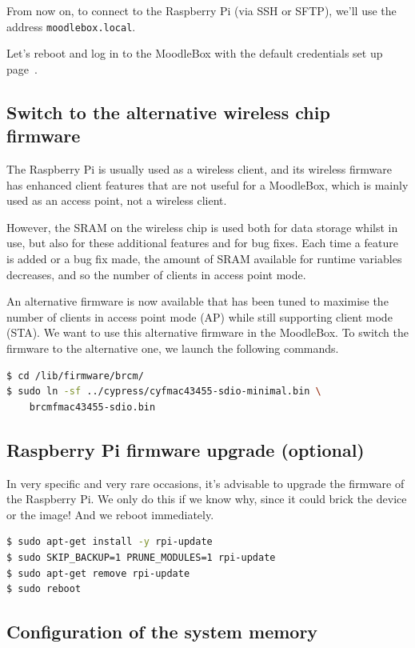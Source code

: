 \documentclass[12pt]{article}
\begin{document}
From now on, to connect to the Raspberry Pi (via SSH or SFTP), we'll use the address \lstinline{moodlebox.local}.

Let's reboot and log in to the MoodleBox with the default credentials set up page~\pageref{ssec-new-account}.

\subsection{Switch to the alternative wireless chip firmware}

The Raspberry Pi is usually used as a wireless client, and its wireless firmware has enhanced client features that are not useful for a MoodleBox, which is mainly used as an access point, not a wireless client.

However, the SRAM on the wireless chip is used both for data storage whilst in use, but also for these additional features and for bug fixes.
Each time a feature is added or a bug fix made, the amount of SRAM available for runtime variables decreases, and so the number of clients in access point mode.

An alternative firmware is now available that has been tuned to maximise the number of clients in access point mode (AP) while still supporting client mode (STA).
We want to use this alternative firmware in the MoodleBox.
To switch the firmware to the alternative one, we launch the following commands.

\begin{lstlisting}[language=bash]
$ cd /lib/firmware/brcm/
$ sudo ln -sf ../cypress/cyfmac43455-sdio-minimal.bin \
    brcmfmac43455-sdio.bin
\end{lstlisting}

\subsection{Raspberry Pi firmware upgrade  (optional)}

In very specific and very rare occasions, it's advisable to upgrade the firmware of the Raspberry Pi.
We only do this if we know why, since it could brick the device or the image!
And we reboot immediately.

\begin{lstlisting}[language=bash]
$ sudo apt-get install -y rpi-update
$ sudo SKIP_BACKUP=1 PRUNE_MODULES=1 rpi-update
$ sudo apt-get remove rpi-update
$ sudo reboot
\end{lstlisting}

\subsection{Configuration of the system memory}
\end{document}
